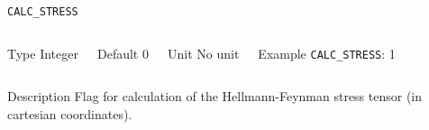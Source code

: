\documentclass[xcolor=dvipsnames,t]{beamer}
\begin{document}
\begin{frame}[allowframebreaks]{\texttt{CALC\_STRESS}} \label{CALC_STRESS}
\vspace*{-12pt}
\begin{columns}
\begin{block}{Type}
Integer
\end{block}

\begin{block}{Default}
0
\end{block}

\begin{block}{Unit}
No unit
\end{block}

\begin{block}{Example}
\texttt{CALC\_STRESS}: 1
\end{block}
\end{columns}

\begin{block}{Description}
Flag for calculation of the Hellmann-Feynman stress tensor (in cartesian coordinates).
\end{block}


\end{frame}
\end{document}
